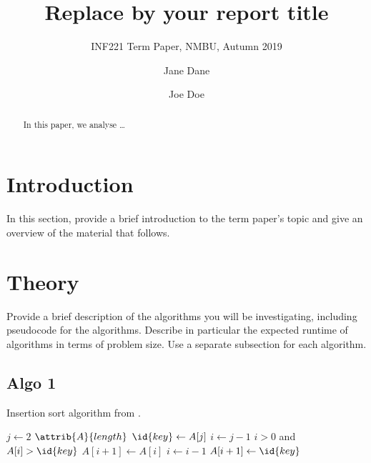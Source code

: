 \documentclass[sigconf, nonacm, natbib, screen, balance=False]{acmart}
\begin{document}
\title{Replace by your report title}
\subtitle{INF221 Term Paper, NMBU, Autumn 2019}

\author{Jane Dane}
\affiliation{}  %

\author{Joe Doe}

\begin{abstract}
  In this paper, we analyse \dots 
\end{abstract}


\maketitle

\section{Introduction}\label{sec:intro}

In this section, provide a brief introduction to the term paper's
topic and give an overview of the material that follows.

\section{Theory}\label{sec:theory}

Provide a brief description of the algorithms you will be
investigating, including pseudocode for the algorithms. Describe in
particular the expected runtime of algorithms in terms of problem
size.  Use a separate subsection for each algorithm.

\subsection{Algo 1}\label{sec:algo1}

\begin{listing}
  \caption{Insertion sort algorithm from \citet[Ch.~2.1]{CLRS_2009}.}
  \label{lst:insertion_algo}
  \begin{codebox}
    \li \For $j \gets 2$ \To $\attrib{A}{length}$
    \li \Do
    $\id{key} \gets A[j]$
    \li     $i \gets j-1$
    \li      \While $i>0$ and $A[i] > \id{key}$
    \li      \Do
    $A[i+1] \gets A[i]$
    \li         $i \gets i-1$
    \End    
    \li       $A[i+1]\gets \id{key}$
    \End
  \end{codebox}
\end{listing}
\end{document}
